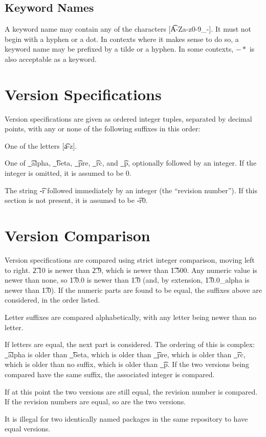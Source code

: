 \subsection{Keyword Names}
\label{keyword-names}
A keyword name may contain any of the characters [\t{A-Za-z0-9\_-}]. It must not begin with a
hyphen or a dot. In contexts where it makes sense to do so, a keyword name may be prefixed by
a tilde or a hyphen. In some contexts, $-*$ is also acceptable as a keyword.

\section{Version Specifications}
Version specifications are given as ordered integer tuples, separated by decimal points, with any or
none of the following suffixes in this order:
\begin{bulletlist}
\item One of the letters [\t{a-z}].
\item One of \t{\_alpha}, \t{\_beta}, \t{\_pre}, \t{\_rc}, and \t{\_p}, optionally followed by an
    integer. If the integer is omitted, it is assumed to be 0.
\item The string \t{-r} followed immediately by an integer (the ``revision number''). If this section
    is not present, it is assumed to be \t{-r0}.
\end{bulletlist}


\section{Version Comparison}

Version specifications are compared using strict integer comparison, moving left to right. \t{2.10}
is newer than \t{2.9}, which is newer than \t{1.500}. Any numeric value is newer than none, so
\t{1.0.0} is newer than \t{1.0} (and, by extension, \t{1.0.0\_alpha} is newer than \t{1.0}).
If the numeric parts are found to be equal, the suffixes above are considered, in the order listed.

Letter suffixes are compared alphabetically, with any letter being newer than no letter.

If letters are equal, the next part is considered. The ordering of this is complex: \t{\_alpha} is
older than \t{\_beta}, which is older than \t{\_pre}, which is older than \t{\_rc}, which is older
than no suffix, which is older than \t{\_p}. If the two versions being compared have the same
suffix, the associated integer is compared.

If at this point the two versions are still equal, the revision number is compared. If the revision
numbers are equal, so are the two versions.

It is illegal for two identically named packages in the same repository to have equal versions.

